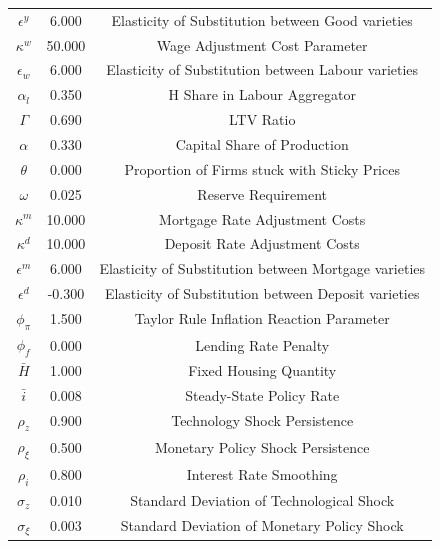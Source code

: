 \begin{center}
\begin{longtable}{ccc}
$\epsilon^y$ 	 & 	 6.000 	 & 	 Elasticity of Substitution between Good varieties\\
$\kappa^w$ 	 & 	 50.000 	 & 	 Wage Adjustment Cost Parameter\\
$\epsilon_w$ 	 & 	 6.000 	 & 	 Elasticity of Substitution between Labour varieties\\
$\alpha_l$ 	 & 	 0.350 	 & 	 H Share in Labour Aggregator\\
$\Gamma$ 	 & 	 0.690 	 & 	 LTV Ratio\\
$\alpha$ 	 & 	 0.330 	 & 	 Capital Share of Production\\
$\theta$ 	 & 	 0.000 	 & 	 Proportion of Firms stuck with Sticky Prices\\
$\omega$ 	 & 	 0.025 	 & 	 Reserve Requirement\\
$\kappa^m$ 	 & 	 10.000 	 & 	 Mortgage Rate Adjustment Costs\\
$\kappa^d$ 	 & 	 10.000 	 & 	 Deposit Rate Adjustment Costs\\
$\epsilon^m$ 	 & 	 6.000 	 & 	 Elasticity of Substitution between Mortgage varieties\\
$\epsilon^d$ 	 & 	 -0.300 	 & 	 Elasticity of Substitution between Deposit varieties\\
$\phi_\pi$ 	 & 	 1.500 	 & 	 Taylor Rule Inflation Reaction Parameter\\
$\phi_f$ 	 & 	 0.000 	 & 	 Lending Rate Penalty\\
$\bar{H}$ 	 & 	 1.000 	 & 	 Fixed Housing Quantity\\
$\bar{i}$ 	 & 	 0.008 	 & 	 Steady-State Policy Rate\\
$\rho_z$ 	 & 	 0.900 	 & 	 Technology Shock Persistence\\
$\rho_\xi$ 	 & 	 0.500 	 & 	 Monetary Policy Shock Persistence\\
$\rho_i$ 	 & 	 0.800 	 & 	 Interest Rate Smoothing\\
$\sigma_z$ 	 & 	 0.010 	 & 	 Standard Deviation of Technological Shock\\
$\sigma_\xi$ 	 & 	 0.003 	 & 	 Standard Deviation of Monetary Policy Shock\\
\bottomrule%
\end{longtable}
\end{center}
